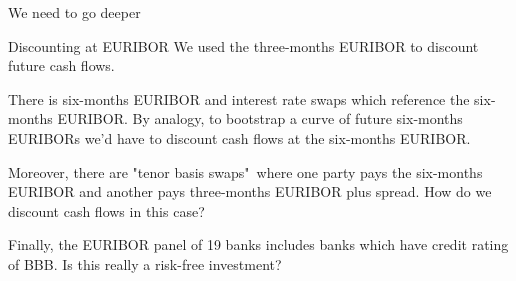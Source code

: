 \documentclass{beamer}
\begin{document}
\begin{frame}{We need to go deeper}
\centering
{}
\end{frame}



\begin{frame}{Discounting at EURIBOR}
\justify
We used the three-months EURIBOR to discount future cash flows.

\justify
There is six-months EURIBOR and interest rate swaps which reference the six-months EURIBOR. By analogy, to bootstrap a curve of future six-months EURIBORs we'd have to discount cash flows at the six-months EURIBOR.

\justify
Moreover, there are "tenor basis swaps"\ where one party pays the six-months EURIBOR and another pays three-months EURIBOR plus spread. How do we discount cash flows in this case?

\justify
Finally, the EURIBOR panel of 19 banks includes banks which have credit rating of BBB. Is this really a risk-free investment?
\end{frame}
\end{document}
